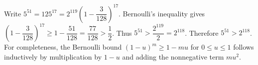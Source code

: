 Write $5^{51}=125^{17}=2^{119}(1-\dfrac{3}{128})^{17}$. Bernoulli's inequality gives $(1-\dfrac{3}{128})^{17}\ge1-\dfrac{51}{128}=\dfrac{77}{128}>\dfrac{1}{2}$. Thus $5^{51}>\dfrac{2^{119}}{2}=2^{118}$. Therefore $\boxed{5^{51}>2^{118}}$. For completeness, the Bernoulli bound $(1-u)^m\ge1-mu$ for $0\le u\le1$ follows inductively by multiplication by $1-u$ and adding the nonnegative term $mu^2$.
